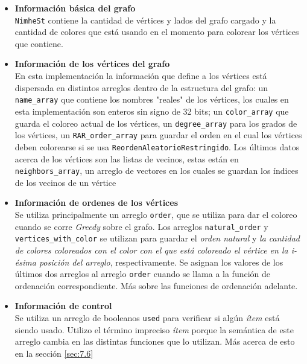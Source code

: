 \documentclass[11pt,a4paper]{article}
\theoremstyle{plain}
\begin{document}
\newpage
\begin{itemize}
\item\textbf{{Información básica del grafo}}\\

 \texttt{NimheSt} contiene la cantidad de vértices y lados del grafo cargado y la cantidad de colores que está usando en el momento para colorear los vértices que contiene.\\

\item\textbf{{Información de los vértices del grafo}}\\
 
 En esta implementación la información que define a los vértices está dispersada en distintos arreglos dentro de la estructura del grafo: un \texttt{name\_array} que contiene los nombres "reales" de los vértices, los cuales en esta implementación son enteros sin signo de 32 bits; un \texttt{color\_array} que guarda el coloreo actual de los vértices, un \texttt{degree\_array} para los grados de los vértices, un \texttt{RAR\_order\_array} para guardar el orden en el cual los vértices deben colorearse si se usa \texttt{ReordenAleatorioRestringido}. Los últimos datos acerca de los vértices son las listas de vecinos, estas están en \texttt{neighbors\_array}, un arreglo de vectores en los cuales se guardan los índices de los vecinos de un vértice\\

\item\textbf{{Información de ordenes de los vértices}}\\

Se utiliza principalmente un arreglo \texttt{order}, que se utiliza para dar el coloreo cuando se corre \emph{Greedy} sobre el grafo. Los arreglos \texttt{natural\_order} y \texttt{vertices\_with\_color} se utilizan para guardar el \emph{orden natural} y \emph{la cantidad de colores coloreados con el color con el que está coloreado el vértice en la i-ésima posición del arreglo}, respectivamente. Se asignan los valores de los últimos dos arreglos al arreglo \texttt{order} cuando se llama a la función de ordenación correspondiente. Más sobre las funciones de ordenación adelante.

\item\textbf{{Información de control}}\\

Se utiliza un arreglo de booleanos \texttt{used} para verificar si algún \emph{ítem} está siendo usado. Utilizo el término impreciso \emph{ítem} porque la semántica de este arreglo cambia en las distintas funciones que lo utilizan. Más acerca de esto en la sección \ref{sec:7.6}


\end{itemize}
\end{document}
